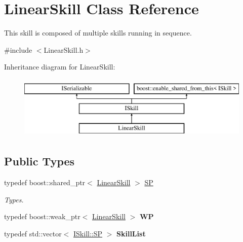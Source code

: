\hypertarget{class_linear_skill}{}\section{Linear\+Skill Class Reference}
\label{class_linear_skill}


This skill is composed of multiple skills running in sequence.  




{\ttfamily \#include $<$Linear\+Skill.\+h$>$}

Inheritance diagram for Linear\+Skill\+:\begin{figure}[H]
\begin{center}
\leavevmode
\includegraphics[height=3.000000cm]{class_linear_skill}
\end{center}
\end{figure}
\subsection*{Public Types}
\begin{DoxyCompactItemize}
\item 
\mbox{\label{class_linear_skill_a512dfa2d2357921fc3d54dc9af8dddc5}} 
typedef boost\+::shared\+\_\+ptr$<$ \hyperlink{class_linear_skill}{Linear\+Skill} $>$ \hyperlink{class_linear_skill_a512dfa2d2357921fc3d54dc9af8dddc5}{SP}
\begin{DoxyCompactList}\small\item\em Types. \end{DoxyCompactList}\item 
\mbox{\label{class_linear_skill_a9c55b54da87a91899a6b37ec96d150ac}} 
typedef boost\+::weak\+\_\+ptr$<$ \hyperlink{class_linear_skill}{Linear\+Skill} $>$ {\bfseries WP}
\item 
\mbox{\label{class_linear_skill_ac7f3bd1abcf82a7618b3d42a14f52903}} 
typedef std\+::vector$<$ \hyperlink{class_i_skill_a68bcce999ab0444eebaca3fb8ddb8a31}{I\+Skill\+::\+SP} $>$ {\bfseries Skill\+List}
\end{DoxyCompactItemize}
